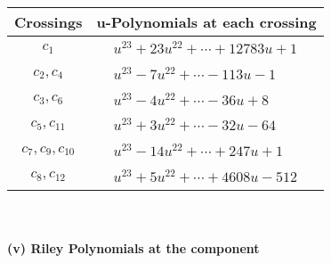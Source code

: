 \documentclass[1p]{elsarticle_modified}
\theoremstyle{definition}
\begin{document}
\begin{tabular}{m{50pt}|m{274pt}}
Crossings & \hspace{64pt}u-Polynomials at each crossing \\
\hline $$\begin{aligned}c_{1}\end{aligned}$$&$\begin{aligned}
&u^{23}+23 u^{22}+\cdots+12783 u+1
\end{aligned}$\\
\hline $$\begin{aligned}c_{2},c_{4}\end{aligned}$$&$\begin{aligned}
&u^{23}-7 u^{22}+\cdots-113 u-1
\end{aligned}$\\
\hline $$\begin{aligned}c_{3},c_{6}\end{aligned}$$&$\begin{aligned}
&u^{23}-4 u^{22}+\cdots-36 u+8
\end{aligned}$\\
\hline $$\begin{aligned}c_{5},c_{11}\end{aligned}$$&$\begin{aligned}
&u^{23}+3 u^{22}+\cdots-32 u-64
\end{aligned}$\\
\hline $$\begin{aligned}c_{7},c_{9},c_{10}\end{aligned}$$&$\begin{aligned}
&u^{23}-14 u^{22}+\cdots+247 u+1
\end{aligned}$\\
\hline $$\begin{aligned}c_{8},c_{12}\end{aligned}$$&$\begin{aligned}
&u^{23}+5 u^{22}+\cdots+4608 u-512
\end{aligned}$\\
\hline
\end{tabular}\\~\\
\newpage\renewcommand{\arraystretch}{1}
\flushleft \textbf{(v) Riley Polynomials at the component}\newline \\
\end{document}
